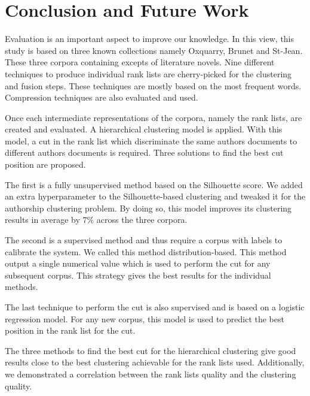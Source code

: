 \chapter{Conclusion and Future Work\label{sec:conclusion}}


Evaluation is an important aspect to improve our knowledge.
In this view, this study is based on three known collections namely Oxquarry, Brunet and St-Jean.
These three corpora containing excepts of literature novels.
Nine different techniques to produce individual rank lists are cherry-picked for the clustering and fusion steps.
These techniques are mostly based on the most frequent words.
Compression techniques are also evaluated and used.

Once each intermediate representations of the corpora, namely the rank lists, are created and evaluated.
A hierarchical clustering model is applied.
With this model, a cut in the rank list which discriminate the same authors documents to different authors documents is required.
Three solutions to find the best cut position are proposed.

The first is a fully unsupervised method based on the Silhouette score.
We added an extra hyperparameter to the Silhouette-based clustering and tweaked it for the authorship clustering problem.
By doing so, this model improves its clustering results in average by $7\%$ across the three corpora.

The second is a supervised method and thus require a corpus with labels to calibrate the system.
We called this method distribution-based.
This method output a single numerical value which is used to perform the cut for any subsequent corpus.
This strategy gives the best results for the individual methods.

The last technique to perform the cut is also supervised and is based on a logistic regression model.
For any new corpus, this model is used to predict the best position in the rank list for the cut.

The three methods to find the best cut for the hierarchical clustering give good results close to the best clustering achievable for the rank lists used.
Additionally, we demonstrated a correlation between the rank lists quality and the clustering quality.

